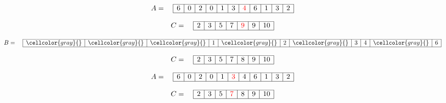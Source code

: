 \documentclass{article}
\begin{document}
\begin{center}
\end{center}

\[
A = \quad
\begin{array}{|c|c|c|c|c|c|c|c|c|c|c|}
\hline
6 & 0 & 2 & 0 & 1 & 3 & \textcolor{red}{4} & 6 & 1 & 3 & 2 \\ 
\hline
\end{array}
\]

\[
C = \quad
\begin{array}{|c|c|c|c|c|c|c|}
\hline
2 & 3 & 5 & 7 & \textcolor{red}{9} & 9 & 10 \\ 
\hline
\end{array}
\]

\[
B = \quad
\begin{array}{|c|c|c|c|c|c|c|c|c|c|c|}
\hline
\cellcolor{gray}{} & \cellcolor{gray}{} & \cellcolor{gray}{} & 
1 & \cellcolor{gray}{} & 2 & 
\cellcolor{gray}{} & 3 & 4 & 
\cellcolor{gray}{} & 6 \\ 
\hline
\end{array}
\]

\[
C = \quad
\begin{array}{|c|c|c|c|c|c|c|}
\hline
2 & 3 & 5 & 7 & 8 & 9 & 10 \\ 
\hline
\end{array}
\]


\begin{center}
\end{center}

\[
A = \quad
\begin{array}{|c|c|c|c|c|c|c|c|c|c|c|}
\hline
6 & 0 & 2 & 0 & 1 & \textcolor{red}{3} & 4 & 6 & 1 & 3 & 2 \\ 
\hline
\end{array}
\]

\[
C = \quad
\begin{array}{|c|c|c|c|c|c|c|}
\hline
2 & 3 & 5 & \textcolor{red}{7} & 8 & 9 & 10 \\ 
\hline
\end{array}
\]
\end{document}
